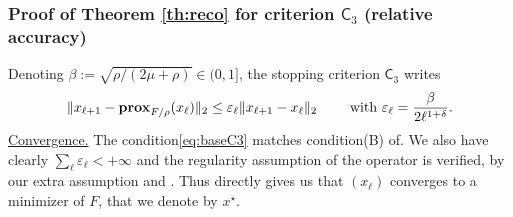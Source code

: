 \subsubsection{Proof of Theorem \ref{th:reco} for criterion $\mathsf{C}_3$ (relative accuracy)}
Denoting $\beta := \sqrt{\rho/(2\mu+\rho)} \in (0,1]$, the stopping criterion $\mathsf{C}_3$ writes
\begin{align}\label{eq:baseC3}
    \|x_{\ell+1} -  \mathbf{prox}_{F/\rho}(x_\ell)\|_2 \leq   \varepsilon_\ell \|x_{\ell+1} -  x_\ell \|_2  \qquad\text{ with }    \varepsilon_\ell =  \frac{\beta}{2\ell^{1+\delta}} .
\end{align}
\noindent\underline{Convergence.} The condition\;\eqref{eq:baseC3} matches condition\;(B) of\;\cite[Th.~2]{rockafellar1976monotone}. We also have clearly $\sum_\ell \varepsilon_\ell < +\infty$ and the regularity assumption of the operator is verified, by our extra assumption and   \cite[Prop.~7]{rockafellar1976monotone}. Thus \cite[Th.~2]{rockafellar1976monotone} directly gives us that $(x_\ell)$ converges to a minimizer of $F$, that we denote by $x^\star$.

